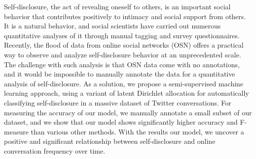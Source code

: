 Self-disclosure, the act of revealing oneself to others, is an important social behavior that contributes positively to intimacy and social support from others. It is a natural behavior, and social scientists have carried out numerous quantitative analyses of it through manual tagging and survey questionnaires. Recently, the flood of data from online social networks (OSN) offers a practical way to observe and analyze self-disclosure behavior at an unprecedented scale. The challenge with such analysis is that OSN data come with no annotations, and it would be impossible to manually annotate the data for a quantitative analysis of self-disclosure. As a solution, we propose a semi-supervised machine learning approach, using a variant of latent Dirichlet allocation for automatically classifying self-disclosure in a massive dataset of Twitter conversations. For measuring the accuracy of our model, we manually annotate a small subset of our dataset, and we show that our model shows significantly higher accuracy and F-measure than various other methods. With the results our model, we uncover a positive and significant relationship between self-disclosure and online conversation frequency over time.
